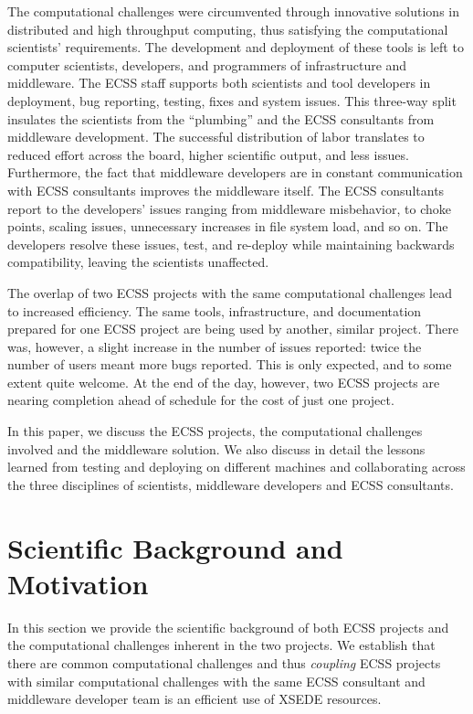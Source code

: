 \documentclass{sig-alternate}
\begin{document}
The computational challenges were circumvented through innovative solutions in
distributed and high throughput computing, thus satisfying the computational
scientists' requirements. The development and deployment of these tools is left
to computer scientists, developers, and programmers of infrastructure and
middleware. The ECSS staff supports both scientists and tool developers in
deployment, bug reporting, testing, fixes and system issues. This three-way
split insulates the scientists from the ``plumbing'' and the ECSS consultants
from middleware development. The successful distribution of labor translates
to reduced effort across the board, higher scientific output, and less issues.
Furthermore, the fact that middleware developers are in constant communication
with ECSS consultants improves the middleware itself. The ECSS consultants
report to the developers' issues ranging from middleware misbehavior,
to choke points, scaling issues, unnecessary increases in file system load, and so
on. The developers resolve these issues, test, and re-deploy while maintaining
backwards compatibility, leaving the scientists unaffected.

The overlap of two ECSS projects with the same computational challenges lead to
increased efficiency. The same tools, infrastructure, and documentation prepared
for one ECSS project are being used by another, similar project. There was,
however, a slight increase in the number of issues reported: twice the number
of users meant more bugs reported. This is only expected, and to some extent
quite welcome. At the end of the day, however, two ECSS projects are nearing
completion ahead of schedule for the cost of just one project.

In this paper, we discuss the ECSS projects, the computational challenges
involved and the middleware solution. We also discuss in detail the lessons
learned from testing and deploying on different machines and collaborating
across the three disciplines of scientists, middleware developers and ECSS
consultants.



\section{Scientific Background and Motivation}

In this section we provide the scientific background of both ECSS
projects and the computational challenges inherent in the two
projects. We establish that there are common computational challenges
and thus {\it coupling} ECSS projects with similar computational
challenges with the same ECSS consultant and middleware developer team
is an efficient use of XSEDE resources.
\end{document}
